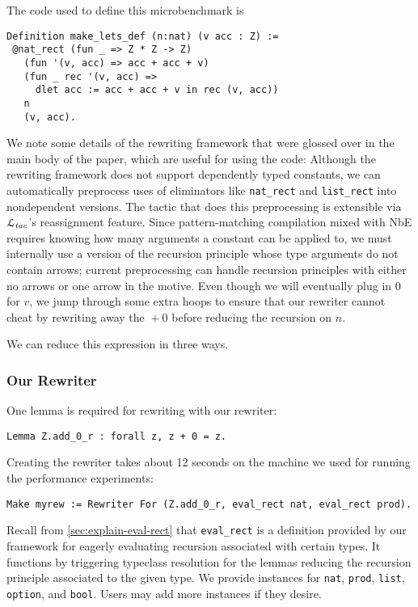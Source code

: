 \documentclass[a4paper,USenglish,cleveref,autoref,thm-restate]{lipics-v2021}
\newcommand{\Ltac}{\ensuremath{\mathcal{L}_\text{\emph{tac}}}}
\begin{document}
The code used to define this microbenchmark is
\begin{verbatim}
Definition make_lets_def (n:nat) (v acc : Z) :=
 @nat_rect (fun _ => Z * Z -> Z)
   (fun '(v, acc) => acc + acc + v)
   (fun _ rec '(v, acc) =>
     dlet acc := acc + acc + v in rec (v, acc))
   n
   (v, acc).
\end{verbatim}
We note some details of the rewriting framework that were glossed over in the main body of the paper, which are useful for using the code:
Although the rewriting framework does not support dependently typed constants, we can automatically preprocess uses of eliminators like \texttt{nat_rect} and \texttt{list_rect} into nondependent versions.
The tactic that does this preprocessing is extensible via \Ltac{}'s reassignment feature.
Since pattern-matching compilation mixed with NbE requires knowing how many arguments a constant can be applied to, we must internally use a version of the recursion principle whose type arguments do not contain arrows; current preprocessing can handle recursion principles with either no arrows or one arrow in the motive.
Even though we will eventually plug in 0 for $v$, we jump through some extra hoops to ensure that our rewriter cannot cheat by rewriting away the ${}+0$ before reducing the recursion on $n$.

We can reduce this expression in three ways.

\subsubsection{Our Rewriter}
One lemma is required for rewriting with our rewriter:
\begin{verbatim}
Lemma Z.add_0_r : forall z, z + 0 = z.
\end{verbatim}

Creating the rewriter takes about 12 seconds on the machine we used for running the performance experiments:
\begin{verbatim}
Make myrew := Rewriter For (Z.add_0_r, eval_rect nat, eval_rect prod).
\end{verbatim}
Recall from \autoref{sec:explain-eval-rect} that \texttt{eval_rect} is a definition provided by our framework for eagerly evaluating recursion associated with certain types.
It functions by triggering typeclass resolution for the lemmas reducing the recursion principle associated to the given type.
We provide instances for \texttt{nat}, \texttt{prod}, \texttt{list}, \texttt{option}, and \texttt{bool}.
Users may add more instances if they desire.
\end{document}
